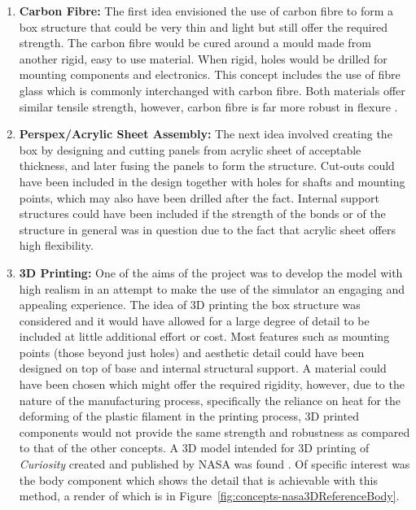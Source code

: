       \begin{enumerate}
        \item \textbf{Carbon Fibre:} The first idea envisioned the use of carbon fibre to form a box structure that could be very thin and light but still offer the required strength. The carbon fibre would be cured around a mould made from another rigid, easy to use material. When rigid, holes would be drilled for mounting components and electronics. This concept includes the use of fibre glass which is commonly interchanged with carbon fibre. Both materials offer similar tensile strength, however, carbon fibre is far more robust in flexure \cite{fibreGlast_2016}.
        
        \item \textbf{Perspex/Acrylic Sheet Assembly:} The next idea involved creating the box by designing and cutting panels from acrylic sheet of acceptable thickness, and later fusing the panels to form the structure. Cut-outs could have been included in the design together with holes for shafts and mounting points, which may also have been drilled after the fact. Internal support structures could have been included if the strength of the bonds or of the structure in general was in question due to the fact that acrylic sheet offers high flexibility.
        
        \item \textbf{3D Printing:} One of the aims of the project was to develop the model with high realism in an attempt to make the use of the simulator an engaging and appealing experience. The idea of 3D printing the box structure was considered and it would have allowed for a large degree of detail to be included at little additional effort or cost. Most features such as mounting points (those beyond just holes) and aesthetic detail could have been designed on top of base and internal structural support. A material could have been chosen which might offer the required rigidity, however, due to the nature of the manufacturing process, specifically the reliance on heat for the deforming of the plastic filament in the printing process, 3D printed components would not provide the same strength and robustness as compared to that of the other concepts. A 3D model intended for 3D printing of \textit{Curiosity} created and published by NASA was found \cite{nasa3Dprint}. Of specific interest was the body component which shows the detail that is achievable with this method, a render of which is in Figure~\ref{fig:concepts-nasa3DReferenceBody}.
        

\end{enumerate}
